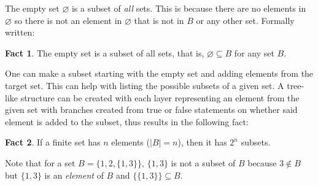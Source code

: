 \documentclass[10pt]{article}
\theoremstyle{definition}
\newtheorem{fact}{Fact}
\begin{document}
    The empty set $\varnothing$ is a subset of \textit{all} sets. This is because there are no elements in $\varnothing$ so there is not an element in $\varnothing$ that is not in $B$ or any other set. Formally written:

    \begin{fact}
        The empty set is a subset of all sets, that is, $\varnothing \subseteq B$ for any set $B$.
    \end{fact}

    One can make a subset starting with the empty set and adding elements from the target set. This can help with listing the possible subsets of a given set. A tree-like structure can be created with each layer representing an element from the given set with branches created from true or false statements on whether said element is added to the subset, thus results in the following fact:

    \begin{fact}
        If a finite set has $n$ elements ($|B|=n$), then it has $2^n$ subsets.
    \end{fact}

    Note that for a set $B = \{1,2,\{1,3\}\}$, $\{1,3\}$ is not a subset of $B$ because $3 \not\in B$ but $\{1,3\}$ is an \textit{element} of $B$ and $\{\{1,3\}\} \subseteq B$.
\end{document}
